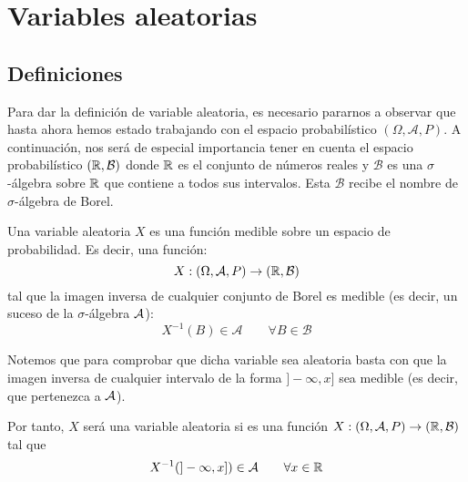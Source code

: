 \chapter{Variables aleatorias}
\section{Definiciones}


Para dar la definición de variable aleatoria, es necesario pararnos a observar que hasta ahora hemos estado trabajando con el espacio probabilístico $(\Omega, \mathcal{A}, P)$.
A continuación, nos será de especial importancia tener en cuenta el espacio probabilístico $(\mathbb R, \mathcal{B})$ donde $\mathbb R$ es el conjunto de números reales y $\mathcal{B}$ es una $\sigma$-álgebra sobre $\mathbb R$ que contiene a todos sus intervalos.
Esta $\mathcal{B}$ recibe el nombre de $\sigma$-álgebra de Borel.

\begin{definicion}
    Una variable aleatoria $X$ es una función medible sobre un espacio de probabilidad. 
    Es decir, una función:
    $$X:(\Omega, \mathcal{A}, P) \rightarrow (\mathbb R, \mathcal{B})$$
    tal que la imagen inversa de cualquier conjunto de Borel es medible (es decir, un suceso de la $\sigma$-álgebra $\mathcal{A}$):
    $$X^{-1}(B) \in \mathcal{A} \qquad \forall B \in \mathcal{B}$$
\end{definicion}

Notemos que para comprobar que dicha variable sea aleatoria basta con que la imagen inversa de cualquier intervalo de la forma $]-\infty, x]$ sea medible (es decir, que pertenezca a $\mathcal{A}$).

Por tanto, $X$ será una variable aleatoria si es una función $X :(\Omega, \mathcal{A}, P) \rightarrow (\mathbb R, \mathcal{B})$ tal que
$$X^{-1}(]-\infty, x]) \in \mathcal{A} \qquad \forall x \in \mathbb R$$

